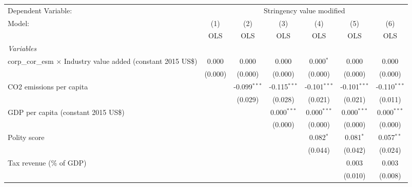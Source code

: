 
\begingroup
\centering
\begin{tabular}{lcccccc}
   \toprule
   Dependent Variable: & \multicolumn{6}{c}{Stringency value modified}\\
   Model:                                                                & (1)     & (2)            & (3)            & (4)            & (5)            & (6)\\  
                                                                         &  OLS    & OLS            & OLS            & OLS            & OLS            & OLS\\  
   \midrule
   \emph{Variables}\\
   corp\_cor\_esm $\times$ Industry value added (constant 2015 US\$)     & 0.000   & 0.000          & 0.000          & 0.000$^{*}$    & 0.000          & 0.000\\   
                                                                         & (0.000) & (0.000)        & (0.000)        & (0.000)        & (0.000)        & (0.000)\\   
   CO2 emissions per capita                                              &         & -0.099$^{***}$ & -0.115$^{***}$ & -0.101$^{***}$ & -0.101$^{***}$ & -0.110$^{***}$\\   
                                                                         &         & (0.029)        & (0.028)        & (0.021)        & (0.021)        & (0.011)\\   
   GDP per capita (constant 2015 US\$)                                   &         &                & 0.000$^{***}$  & 0.000$^{***}$  & 0.000$^{***}$  & 0.000$^{***}$\\   
                                                                         &         &                & (0.000)        & (0.000)        & (0.000)        & (0.000)\\   
   Polity score                                                          &         &                &                & 0.082$^{*}$    & 0.081$^{*}$    & 0.057$^{**}$\\   
                                                                         &         &                &                & (0.044)        & (0.042)        & (0.024)\\   
   Tax revenue (\% of GDP)                                               &         &                &                &                & 0.003          & 0.003\\   
                                                                         &         &                &                &                & (0.010)        & (0.008)\\   

\end{tabular}
